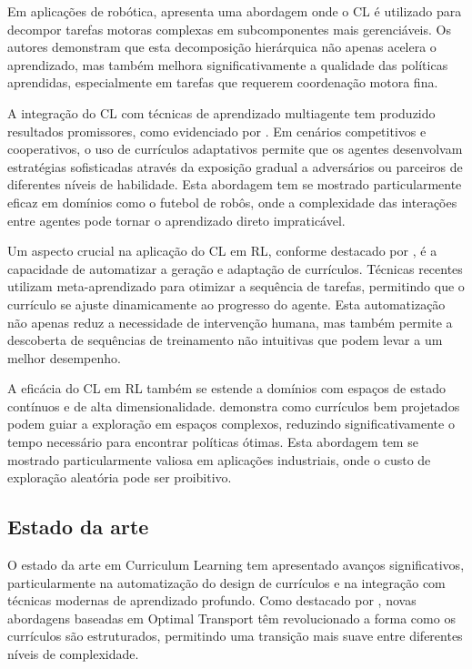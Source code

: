 Em aplicações de robótica, \cite{https://arxiv.org/abs/2003.04960} apresenta uma abordagem onde o CL é utilizado para decompor tarefas motoras complexas em subcomponentes mais gerenciáveis. Os autores demonstram que esta decomposição hierárquica não apenas acelera o aprendizado, mas também melhora significativamente a qualidade das políticas aprendidas, especialmente em tarefas que requerem coordenação motora fina.

A integração do CL com técnicas de aprendizado multiagente tem produzido resultados promissores, como evidenciado por \cite{https://www.ijcai.org/proceedings/2017/757}. Em cenários competitivos e cooperativos, o uso de currículos adaptativos permite que os agentes desenvolvam estratégias sofisticadas através da exposição gradual a adversários ou parceiros de diferentes níveis de habilidade. Esta abordagem tem se mostrado particularmente eficaz em domínios como o futebol de robôs, onde a complexidade das interações entre agentes pode tornar o aprendizado direto impraticável.

Um aspecto crucial na aplicação do CL em RL, conforme destacado por \cite{https://arxiv.org/abs/2310.19424}, é a capacidade de automatizar a geração e adaptação de currículos. Técnicas recentes utilizam meta-aprendizado para otimizar a sequência de tarefas, permitindo que o currículo se ajuste dinamicamente ao progresso do agente. Esta automatização não apenas reduz a necessidade de intervenção humana, mas também permite a descoberta de sequências de treinamento não intuitivas que podem levar a um melhor desempenho.

A eficácia do CL em RL também se estende a domínios com espaços de estado contínuos e de alta dimensionalidade. \cite{https://dl.acm.org/doi/10.1145/3503161.3548549} demonstra como currículos bem projetados podem guiar a exploração em espaços complexos, reduzindo significativamente o tempo necessário para encontrar políticas ótimas. Esta abordagem tem se mostrado particularmente valiosa em aplicações industriais, onde o custo de exploração aleatória pode ser proibitivo.

\subsection{Estado da arte}
\label{subsec:curriculum_estado_arte}

O estado da arte em Curriculum Learning tem apresentado avanços significativos, particularmente na automatização do design de currículos e na integração com técnicas modernas de aprendizado profundo. Como destacado por \cite{https://proceedings.mlr.press/v162/klink22a/klink22a.pdf}, novas abordagens baseadas em Optimal Transport têm revolucionado a forma como os currículos são estruturados, permitindo uma transição mais suave entre diferentes níveis de complexidade.

